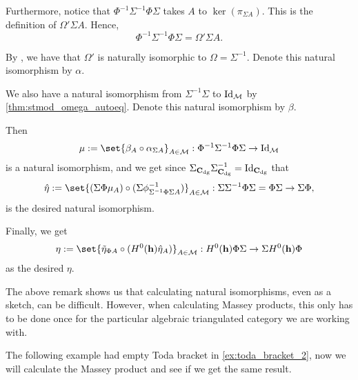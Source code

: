 \begin{remark}
    Furthermore, notice that \( \Phi^{-1} \Sigma^{-1} \Phi \Sigma \) takes \( A \) to \( \ker(\pi_{\Sigma A}) \). This is the definition of \( \Omega' \Sigma A \). Hence,
    \[
        \Phi^{-1} \Sigma^{-1} \Phi \Sigma = \Omega' \Sigma A.
    \]

    By \cite[p.\ 13]{Happel_1988}, we have that \( \Omega' \) is naturally isomorphic to \( \Omega = \Sigma^{-1} \). Denote this natural isomorphism by \( \alpha \).

    We also have a natural isomorphism from \( \Sigma^{-1} \Sigma \) to \( \operatorname{Id}_{{\mathcal{M}}} \) by \autoref{thm:stmod_omega_autoeq}. Denote this natural isomorphism by \( \beta \).

    Then
    \[
       \mu := \set{ \beta_A \circ \alpha_{\Sigma A} }_{A \in \Mc} :\Phi^{-1} \Sigma^{-1} \Phi \Sigma \to \Id_{\Mc}
    \]
    is a natural isomorphism, and we get since \( \Sigma_{\operatorname{\mathbf{C}}_{\operatorname{dg}}} \Sigma^{-1}_{\operatorname{\mathbf{C}}_{\operatorname{dg}}} = \operatorname{Id}_{\operatorname{\mathbf{C}}_{\operatorname{dg}}} \) that
    \[
        \hat{\eta} := \set{(\Sigma \Phi \mu_A) \circ (\Sigma \phi^{-1}_{\Sigma^{-1} \Phi \Sigma A})}_{A \in \Mc}: \Sigma \Sigma^{-1} \Phi \Sigma = \Phi \Sigma \to \Sigma \Phi,
    \]
    is the desired natural isomorphism.

    Finally, we get
    \[
        \eta := \set{ \tilde{\eta}_{\Phi A} \circ (H^0(\mathbf{h}) \hat{\eta}_A) }_{A \in \Mc}: H^0(\mathbf{h}) \Phi \Sigma \to \Sigma H^0(\mathbf{h}) \Phi
    \]
    as the desired \( \eta \).
\end{remark}

The above remark shows us that calculating natural isomorphisms, even as a sketch, can be difficult. However, when calculating Massey products, this only has to be done once for the particular algebraic triangulated category we are working with.

The following example had empty Toda bracket in \autoref{ex:toda_bracket_2}, now we will calculate the Massey product and see if we get the same result.

